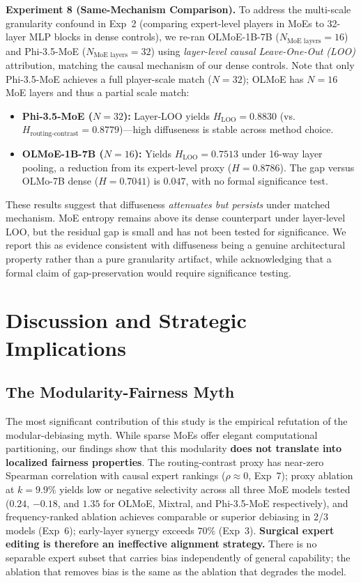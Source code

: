 \documentclass[11pt,a4paper]{article}
\begin{document}
\textbf{Experiment 8 (Same-Mechanism Comparison).} To address the multi-scale granularity confound in Exp~2 (comparing expert-level players in MoEs to 32-layer MLP blocks in dense controls), we re-ran OLMoE-1B-7B ($N_{\text{MoE layers}} = 16$) and Phi-3.5-MoE ($N_{\text{MoE layers}} = 32$) using \textit{layer-level causal Leave-One-Out (LOO)} attribution, matching the causal mechanism of our dense controls. Note that only Phi-3.5-MoE achieves a full player-scale match ($N=32$); OLMoE has $N=16$ MoE layers and thus a partial scale match:
\begin{itemize}
    \item \textbf{Phi-3.5-MoE ($N=32$):} Layer-LOO yields $H_{\text{LOO}} = 0.8830$ (vs.\ $H_{\text{routing-contrast}} = 0.8779$)—high diffuseness is stable across method choice.
    \item \textbf{OLMoE-1B-7B ($N=16$):} Yields $H_{\text{LOO}} = 0.7513$ under 16-way layer pooling, a reduction from its expert-level proxy ($H = 0.8786$). The gap versus OLMo-7B dense ($H = 0.7041$) is $0.047$, with no formal significance test.
\end{itemize}
These results suggest that diffuseness \textit{attenuates but persists} under matched mechanism. MoE entropy remains above its dense counterpart under layer-level LOO, but the residual gap is small and has not been tested for significance. We report this as evidence consistent with diffuseness being a genuine architectural property rather than a pure granularity artifact, while acknowledging that a formal claim of gap-preservation would require significance testing.

\section{Discussion and Strategic Implications}

\subsection{The Modularity-Fairness Myth}
The most significant contribution of this study is the empirical refutation of the modular-debiasing myth. While sparse MoEs offer elegant computational partitioning, our findings show that this modularity \textbf{does not translate into localized fairness properties}. The routing-contrast proxy has near-zero Spearman correlation with causal expert rankings ($\rho \approx 0$, Exp~7); proxy ablation at $k=9.9\%$ yields low or negative selectivity across all three MoE models tested ($0.24$, $-0.18$, and $1.35$ for OLMoE, Mixtral, and Phi-3.5-MoE respectively), and frequency-ranked ablation achieves comparable or superior debiasing in 2/3 models (Exp~6); early-layer synergy exceeds $70\%$ (Exp~3). \textbf{Surgical expert editing is therefore an ineffective alignment strategy.} There is no separable expert subset that carries bias independently of general capability; the ablation that removes bias is the same as the ablation that degrades the model.
\end{document}
